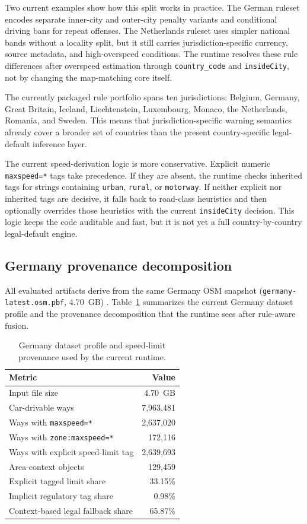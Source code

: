 \documentclass{article}
\begin{document}
Two current examples show how this split works in practice. The German ruleset encodes separate inner-city and outer-city penalty variants and conditional driving bans for repeat offenses. The Netherlands ruleset uses simpler national bands without a locality split, but it still carries jurisdiction-specific currency, source metadata, and high-overspeed conditions. The runtime resolves these rule differences after overspeed estimation through \texttt{country\_code} and \texttt{insideCity}, not by changing the map-matching core itself.

The currently packaged rule portfolio spans ten jurisdictions: Belgium, Germany, Great Britain, Iceland, Liechtenstein, Luxembourg, Monaco, the Netherlands, Romania, and Sweden. This means that jurisdiction-specific warning semantics already cover a broader set of countries than the present country-specific legal-default inference layer.

The current speed-derivation logic is more conservative. Explicit numeric \texttt{maxspeed=*} tags take precedence. If they are absent, the runtime checks inherited tags for strings containing \texttt{urban}, \texttt{rural}, or \texttt{motorway}. If neither explicit nor inherited tags are decisive, it falls back to road-class heuristics and then optionally overrides those heuristics with the current \texttt{insideCity} decision. This logic keeps the code auditable and fast, but it is not yet a full country-by-country legal-default engine.

\subsection{Germany provenance decomposition}
All evaluated artifacts derive from the same Germany OSM snapshot (\texttt{germany-latest.osm.pbf}, \SI{4.70}{GB}) \cite{geofabrik2026}. Table~\ref{tab:germany_provenance} summarizes the current Germany dataset profile and the provenance decomposition that the runtime sees after rule-aware fusion.

\begin{table}[!htbp]
\centering
\caption{Germany dataset profile and speed-limit provenance used by the current runtime.}
\label{tab:germany_provenance}
\begin{tabular}{p{7.9cm}r}
\toprule
Metric & Value \\
\midrule
Input file size & \SI{4.70}{GB} \\
Car-drivable ways & 7{,}963{,}481 \\
Ways with \texttt{maxspeed=*} & 2{,}637{,}020 \\
Ways with \texttt{zone:maxspeed=*} & 172{,}116 \\
Ways with explicit speed-limit tag & 2{,}639{,}693 \\
Area-context objects & 129{,}459 \\
\midrule
Explicit tagged limit share & 33.15\% \\
Implicit regulatory tag share & 0.98\% \\
Context-based legal fallback share & 65.87\% \\
\bottomrule
\end{tabular}
\end{table}
\end{document}
